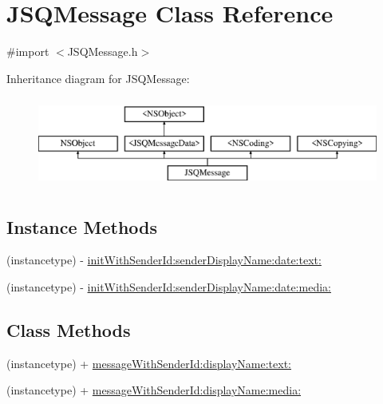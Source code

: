 \hypertarget{interface_j_s_q_message}{}\section{J\+S\+Q\+Message Class Reference}
\label{interface_j_s_q_message}


{\ttfamily \#import $<$J\+S\+Q\+Message.\+h$>$}

Inheritance diagram for J\+S\+Q\+Message\+:\begin{figure}[H]
\begin{center}
\leavevmode
\includegraphics[height=3.000000cm]{interface_j_s_q_message}
\end{center}
\end{figure}
\subsection*{Instance Methods}
\begin{DoxyCompactItemize}
\item 
(instancetype) -\/ \hyperlink{interface_j_s_q_message_a7e247dcaafa92be3bdc2998d204426a7}{init\+With\+Sender\+Id\+:sender\+Display\+Name\+:date\+:text\+:}
\item 
(instancetype) -\/ \hyperlink{interface_j_s_q_message_a1356c8de521c5e8ef056debd09f2737d}{init\+With\+Sender\+Id\+:sender\+Display\+Name\+:date\+:media\+:}
\end{DoxyCompactItemize}
\subsection*{Class Methods}
\begin{DoxyCompactItemize}
\item 
(instancetype) + \hyperlink{interface_j_s_q_message_a823956135dbc7fba7683360d5097665b}{message\+With\+Sender\+Id\+:display\+Name\+:text\+:}
\item 
(instancetype) + \hyperlink{interface_j_s_q_message_af59d44af5bcc06473f95e9b6589407d9}{message\+With\+Sender\+Id\+:display\+Name\+:media\+:}
\end{DoxyCompactItemize}
